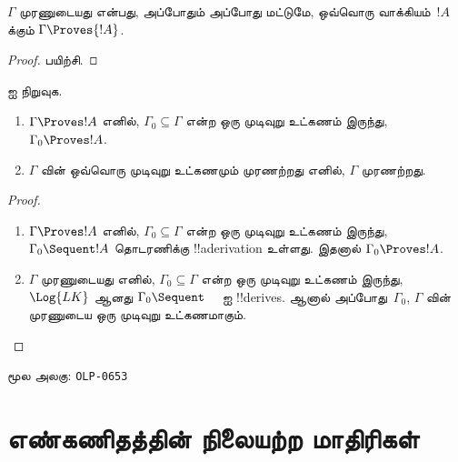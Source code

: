 \documentclass[11pt,a4paper,openany]{memoir}
\begin{document}
\begin{prop}
$\Gamma$ முரணுடையது என்பது, அப்போதும் அப்போது மட்டுமே, ஒவ்வொரு
வாக்கியம்~$!A$ க்கும் $\Gamma \Proves {!A}$.
\end{prop}

\begin{proof}
பயிற்சி.
\end{proof}

\begin{prob}
 ஐ நிறுவுக.
\end{prob}

\begin{prop}[இறுக்கத்தன்மை]
  \begin{enumerate}
  \item $\Gamma \Proves !A$ எனில், $\Gamma_0 \subseteq \Gamma$ என்ற ஒரு
    முடிவுறு உட்கணம் இருந்து, $\Gamma_0 \Proves !A$.
  \item $\Gamma$ வின் ஒவ்வொரு முடிவுறு உட்கணமும் முரணற்றது எனில்,
    $\Gamma$ முரணற்றது.
  \end{enumerate}
\end{prop}

\begin{proof}
  \begin{enumerate}
    \item $\Gamma \Proves !A$ எனில், $\Gamma_0 \subseteq \Gamma$ என்ற ஒரு
      முடிவுறு உட்கணம் இருந்து, $\Gamma_0 \Sequent !A$ தொடரணிக்கு
      !!a{derivation} உள்ளது. இதனால் $\Gamma_0 \Proves !A$.
    \item $\Gamma$ முரணுடையது எனில், $\Gamma_0 \subseteq \Gamma$ என்ற ஒரு
      முடிவுறு உட்கணம் இருந்து, $\Log{LK}$ ஆனது $\Gamma_0 \Sequent \quad$ ஐ
      !!{derive}s. ஆனால் அப்போது~$\Gamma_0$, $\Gamma$ வின் முரணுடைய ஒரு
      முடிவுறு உட்கணமாகும்.
  \end{enumerate}
\end{proof}



\clearpage
\noindent மூல அலகு: \texttt{OLP-0653}\par



\section{எண்கணிதத்தின் நிலையற்ற மாதிரிகள்}
\end{document}
